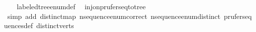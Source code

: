 \begin{isabellebody}
%
\isadelimproof
\ \ %
\endisadelimproof
%
\isatagproof
{}\isamarkupfalse%
\ labeled{\isacharunderscore}{\kern0pt}tree{\isacharunderscore}{\kern0pt}enum{\isacharunderscore}{\kern0pt}def\ \isamarkupfalse%
\ inj{\isacharunderscore}{\kern0pt}on{\isacharunderscore}{\kern0pt}prufer{\isacharunderscore}{\kern0pt}seq{\isacharunderscore}{\kern0pt}to{\isacharunderscore}{\kern0pt}tree\isanewline
\ \ \isamarkupfalse%
\ {\isacharparenleft}{\kern0pt}simp\ add{\isacharcolon}{\kern0pt}\ distinct{\isacharunderscore}{\kern0pt}map\ n{\isacharunderscore}{\kern0pt}sequence{\isacharunderscore}{\kern0pt}enum{\isacharunderscore}{\kern0pt}correct\ n{\isacharunderscore}{\kern0pt}sequence{\isacharunderscore}{\kern0pt}enum{\isacharunderscore}{\kern0pt}distinct\ prufer{\isacharunderscore}{\kern0pt}sequences{\isacharunderscore}{\kern0pt}def\ distinct{\isacharunderscore}{\kern0pt}verts{\isacharparenright}{\kern0pt}%
\endisatagproof
{\isafoldproof}%
%
\isadelimproof
\isanewline
%
\endisadelimproof
\isanewline
\isanewline
{}\isamarkupfalse%
\isanewline
%
\isadelimtheory
\isanewline
%
\endisadelimtheory
%
\isatagtheory
{}\isamarkupfalse%
%
\endisatagtheory
{\isafoldtheory}%
%
\isadelimtheory
%
\endisadelimtheory
%
\end{isabellebody}%
\endinput
